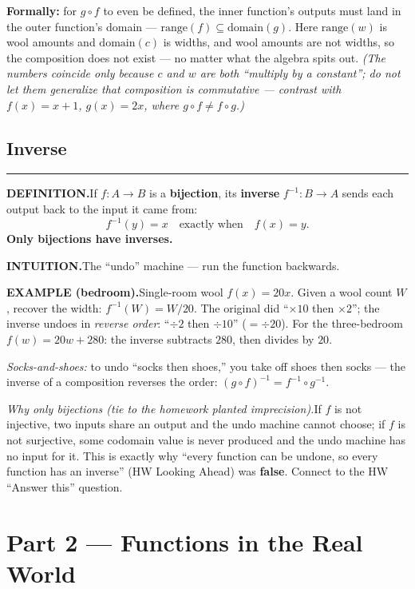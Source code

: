 \documentclass[12pt]{article}
\begin{document}
\textbf{Formally:} for $g \circ f$ to even be defined, the inner function's outputs must land in the outer function's domain --- $\text{range}(f) \subseteq \text{domain}(g)$. Here $\text{range}(w)$ is wool amounts and $\text{domain}(c)$ is widths, and wool amounts are not widths, so the composition does not exist --- no matter what the algebra spits out. \textit{(The numbers coincide only because $c$ and $w$ are both ``multiply by a constant''; do not let them generalize that composition is commutative --- contrast with $f(x)=x+1$, $g(x)=2x$, where $g \circ f \ne f \circ g$.)}

\subsection*{Inverse}
\hrule
\textbf{DEFINITION.}\quad If $f\colon A \to B$ is a \textbf{bijection}, its \textbf{inverse} $f^{-1}\colon B \to A$ sends each output back to the input it came from:
\[
  f^{-1}(y) = x \quad\text{exactly when}\quad f(x) = y.
\]
\textbf{Only bijections have inverses.}

\textbf{INTUITION.}\quad The ``undo'' machine --- run the function backwards.

\textbf{EXAMPLE (bedroom).}\quad Single-room wool $f(x) = 20x$. Given a wool count $W$, recover the width: $f^{-1}(W) = W/20$. The original did ``$\times 10$ then $\times 2$''; the inverse undoes in \emph{reverse order}: ``$\div 2$ then $\div 10$'' ($= \div 20$). For the three-bedroom $f(w) = 20w + 280$: the inverse subtracts $280$, then divides by $20$.

\textit{Socks-and-shoes:} to undo ``socks then shoes,'' you take off shoes then socks --- the inverse of a composition reverses the order: $(g \circ f)^{-1} = f^{-1} \circ g^{-1}$.

\textit{Why only bijections (tie to the homework planted imprecision).}\quad If $f$ is not injective, two inputs share an output and the undo machine cannot choose; if $f$ is not surjective, some codomain value is never produced and the undo machine has no input for it. This is exactly why ``every function can be undone, so every function has an inverse'' (HW Looking Ahead) was \textbf{false}. Connect to the HW ``Answer this'' question.

\section*{Part 2 --- Functions in the Real World}
\end{document}
